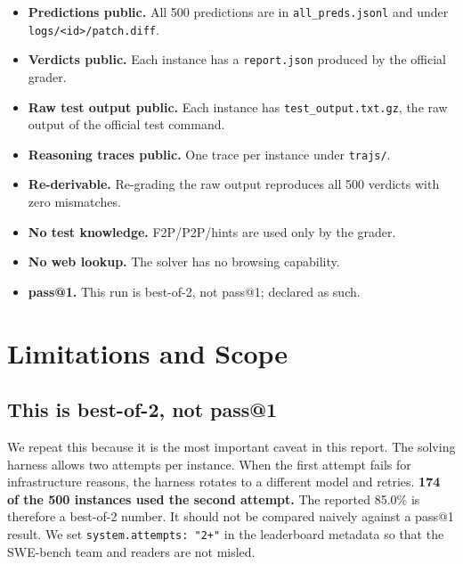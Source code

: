 \documentclass[11pt,a4paper]{article}
\begin{document}
\begin{itemize}[leftmargin=1.4em]
  \item[\checkmark] \textbf{Predictions public.} All 500 predictions are in
  \texttt{all\_preds.jsonl} and under \texttt{logs/<id>/patch.diff}.
  \item[\checkmark] \textbf{Verdicts public.} Each instance has a \texttt{report.json}
  produced by the official grader.
  \item[\checkmark] \textbf{Raw test output public.} Each instance has
  \texttt{test\_output.txt.gz}, the raw output of the official test command.
  \item[\checkmark] \textbf{Reasoning traces public.} One trace per instance under
  \texttt{trajs/}.
  \item[\checkmark] \textbf{Re-derivable.} Re-grading the raw output reproduces all 500
  verdicts with zero mismatches.
  \item[\checkmark] \textbf{No test knowledge.} F2P/P2P/hints are used only by the grader.
  \item[\checkmark] \textbf{No web lookup.} The solver has no browsing capability.
  \item[\texttimes] \textbf{pass@1.} This run is best-of-2, not pass@1; declared as such.
\end{itemize}

\section{Limitations and Scope}
\label{sec:limitations}

\subsection{This is best-of-2, not pass@1}

We repeat this because it is the most important caveat in this report. The solving
harness allows two attempts per instance. When the first attempt fails for infrastructure
reasons, the harness rotates to a different model and retries. \textbf{174 of the 500
instances used the second attempt.} The reported 85.0\% is therefore a best-of-2 number.
It should not be compared naively against a pass@1 result. We set
\texttt{system.attempts: "2+"} in the leaderboard metadata so that the SWE-bench team and
readers are not misled.
\end{document}

